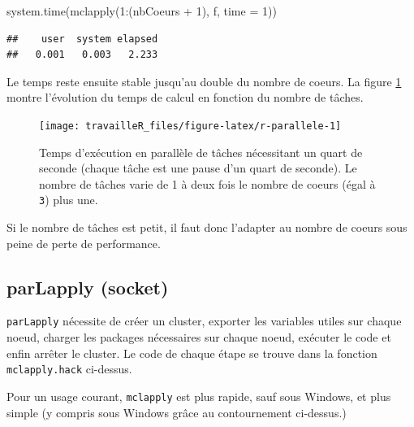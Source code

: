 \documentclass[
  11pt,
  french,
  a4paper,
  extrafontsizes,onecolumn,openright
  ]{memoir}
\newenvironment{Shaded}{\begin{snugshade}}{\end{snugshade}}
\newcommand{\AttributeTok}[1]{\textcolor[rgb]{0.77,0.63,0.00}{#1}}
\newcommand{\DecValTok}[1]{\textcolor[rgb]{0.00,0.00,0.81}{#1}}
\newcommand{\FunctionTok}[1]{\textcolor[rgb]{0.00,0.00,0.00}{#1}}
\newcommand{\NormalTok}[1]{#1}
\newcommand{\SpecialCharTok}[1]{\textcolor[rgb]{0.00,0.00,0.00}{#1}}
\begin{document}
\begin{Shaded}
\begin{Highlighting}[]
\FunctionTok{system.time}\NormalTok{(}\FunctionTok{mclapply}\NormalTok{(}\DecValTok{1}\SpecialCharTok{:}\NormalTok{(nbCoeurs }\SpecialCharTok{+} \DecValTok{1}\NormalTok{), f, }\AttributeTok{time =} \DecValTok{1}\NormalTok{))}
\end{Highlighting}
\end{Shaded}

\begin{verbatim}
##    user  system elapsed 
##   0.001   0.003   2.233
\end{verbatim}

\normalsize

Le temps reste ensuite stable jusqu'au double du nombre de coeurs.
La figure \ref{fig:r-parallele} montre l'évolution du temps de calcul en fonction du nombre de tâches.



\scriptsize

\begin{figure}

{\centering \texttt{[image: travailleR\_files/figure-latex/r-parallele-1]} 

}

\caption{Temps d'exécution en parallèle de tâches nécessitant un quart de seconde (chaque tâche est une pause d'un quart de seconde). Le nombre de tâches varie de 1 à deux fois le nombre de coeurs (égal à \texttt{3}) plus une.}\label{fig:r-parallele}
\end{figure}

\normalsize

Si le nombre de tâches est petit, il faut donc l'adapter au nombre de coeurs sous peine de perte de performance.

\hypertarget{parlapply-socket}{%
\subsection{parLapply (socket)}\label{parlapply-socket}}

\texttt{parLapply} nécessite de créer un cluster, exporter les variables utiles sur chaque noeud, charger les packages nécessaires sur chaque noeud, exécuter le code et enfin arrêter le cluster.
Le code de chaque étape se trouve dans la fonction \texttt{mclapply.hack} ci-dessus.

Pour un usage courant, \texttt{mclapply} est plus rapide, sauf sous Windows, et plus simple (y compris sous Windows grâce au contournement ci-dessus.)
\end{document}
